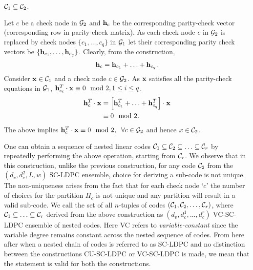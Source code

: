 \documentclass[journal,draftcls,onecolumn,12pt,twoside]{IEEEtran}
\begin{document}
\begin{lemma}\label{Lemma:NestedCodes}
$ \mathcal{C}_{1} \subseteq \mathcal{C}_{2}$.
\end{lemma}
\begin{IEEEproof}
Let $c$ be a check node in $\mathcal{G}_{2}$ and $\mathbf{h}_{c}$ be the  corresponding parity-check vector (corresponding row in parity-check matrix). As each check node $c$ in $\mathcal{G}_{2}$ is replaced by check nodes $\{c_{1},\ldots , c_{q}\}$ in $\mathcal{G}_{1}$ let their corresponding parity check vectors be $\{\mathbf{h}_{c_{1}},\ldots , \mathbf{h}_{c_{q}}\}$. Clearly, from the construction,
\begin{align*}
\mathbf{h}_{c}=\mathbf{h}_{c_{1}}+\ldots +\mathbf{h}_{c_{q}}.
\end{align*}
Consider $\mathbf{x}\in\mathcal{C}_{1}$ and a check node $c\in \mathcal{G}_{2}$. As $\mathbf{x}$ satisfies all the parity-check equations in $\mathcal{G}_{1}$, $\mathbf{h}^{T}_{c_{i}}\cdot \mathbf{x}\equiv 0 \mod 2, 1\leq i \leq q$.
\begin{align*}
\mathbf{h}^{T}_{c}\cdot \mathbf{x}&=\left[\mathbf{h}^{T}_{c_{1}}+\ldots +\mathbf{h}^{T}_{c_{q}}\right] \cdot \mathbf{x}\\
												&\equiv 0 \mod 2. 
\end{align*}
The above implies $\mathbf{h}^{T}_{c}\cdot \mathbf{x}\equiv 0 \mod 2, \hspace{0.2cm} \forall c\in \mathcal{G}_{2}$ and hence $x\in \mathcal{C}_{2}$.
\end{IEEEproof}
One can obtain a sequence of nested linear codes $\mathcal{C}_1\subseteq\mathcal{C}_2\subseteq \ldots\subseteq\mathcal{C}_r$ by repeatedly performing the above operation, starting from $\mathcal{C}_{r}$. We observe that in this construction, unlike the previous construction, for any code $\mathcal{C}_{2}$ from the $(d_{v},d_{c}^{2},L,w)$ SC-LDPC ensemble, choice for deriving a sub-code is not unique. The non-uniqueness arises from the fact that for each check node `$c$' the number of choices for the partition $\Pi_{c}$ is not unique and any partition will result in a valid sub-code. We call the set of all $n$-tuples of codes $(\mathcal{C}_{1},\mathcal{C}_{2},\ldots,\mathcal{C}_{r})$, where $\mathcal{C}_{1}\subseteq \ldots\subseteq\mathcal{C}_{r}$ derived from the above construction as $(d_{v},d_{c}^{1},\ldots,d_{c}^{r})$ VC-SC-LDPC ensemble of nested codes. Here VC refers to \textit{variable-constant} since the variable degree remains constant across the nested sequence of codes. From here after when a nested chain of codes is referred to as SC-LDPC and no distinction between the constructions CU-SC-LDPC or VC-SC-LDPC is made, we mean that the statement is valid for both the constructions. 
\end{document}
